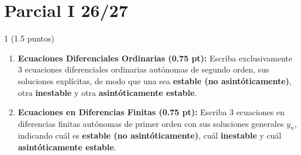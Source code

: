 \chapter{Parcial I 26/27}
\begin{ejer}{1 (1.5 puntos)}
\begin{enumerate}
    \item \textbf{Ecuaciones Diferenciales Ordinarias (0.75 pt):} Escriba exclusivamente 3 ecuaciones diferenciales ordinarias autónomas de segundo orden, sus soluciones explícitas, de modo que una sea \textbf{estable (no asintóticamente)}, otra \textbf{inestable} y otra \textbf{asintóticamente estable}.
    \item \textbf{Ecuaciones en Diferencias Finitas (0.75 pt):} Escriba 3 ecuaciones en diferencias finitas autónomas de primer orden con sus soluciones generales $y_n$, indicando cuál es \textbf{estable (no asintóticamente)}, cuál \textbf{inestable} y cuál \textbf{asintóticamente estable}.
\end{enumerate}
\end{ejer}

